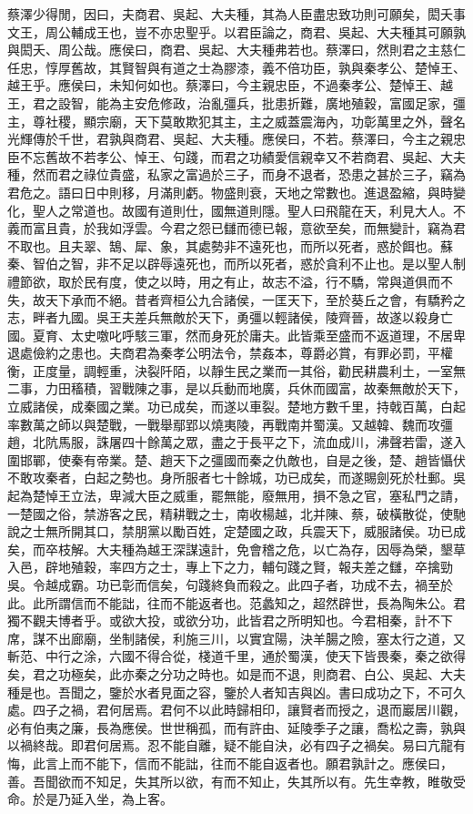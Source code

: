 蔡澤少得閒，因曰，夫商君、吳起、大夫種，其為人臣盡忠致功則可願矣，閎夭事文王，周公輔成王也，豈不亦忠聖乎。以君臣論之，商君、吳起、大夫種其可願孰與閎夭、周公哉。應侯曰，商君、吳起、大夫種弗若也。蔡澤曰，然則君之主慈仁任忠，惇厚舊故，其賢智與有道之士為膠漆，義不倍功臣，孰與秦孝公、楚悼王、越王乎。應侯曰，未知何如也。蔡澤曰，今主親忠臣，不過秦孝公、楚悼王、越王，君之設智，能為主安危修政，治亂彊兵，批患折難，廣地殖穀，富國足家，彊主，尊社稷，顯宗廟，天下莫敢欺犯其主，主之威蓋震海內，功彰萬里之外，聲名光輝傳於千世，君孰與商君、吳起、大夫種。應侯曰，不若。蔡澤曰，今主之親忠臣不忘舊故不若孝公、悼王、句踐，而君之功績愛信親幸又不若商君、吳起、大夫種，然而君之祿位貴盛，私家之富過於三子，而身不退者，恐患之甚於三子，竊為君危之。語曰日中則移，月滿則虧。物盛則衰，天地之常數也。進退盈縮，與時變化，聖人之常道也。故國有道則仕，國無道則隱。聖人曰飛龍在天，利見大人。不義而富且貴，於我如浮雲。今君之怨已讎而德已報，意欲至矣，而無變計，竊為君不取也。且夫翠、鵠、犀、象，其處勢非不遠死也，而所以死者，惑於餌也。蘇秦、智伯之智，非不足以辟辱遠死也，而所以死者，惑於貪利不止也。是以聖人制禮節欲，取於民有度，使之以時，用之有止，故志不溢，行不驕，常與道俱而不失，故天下承而不絕。昔者齊桓公九合諸侯，一匡天下，至於葵丘之會，有驕矜之志，畔者九國。吳王夫差兵無敵於天下，勇彊以輕諸侯，陵齊晉，故遂以殺身亡國。夏育、太史噭叱呼駭三軍，然而身死於庸夫。此皆乘至盛而不返道理，不居卑退處儉約之患也。夫商君為秦孝公明法令，禁姦本，尊爵必賞，有罪必罰，平權衡，正度量，調輕重，決裂阡陌，以靜生民之業而一其俗，勸民耕農利土，一室無二事，力田稸積，習戰陳之事，是以兵動而地廣，兵休而國富，故秦無敵於天下，立威諸侯，成秦國之業。功已成矣，而遂以車裂。楚地方數千里，持戟百萬，白起率數萬之師以與楚戰，一戰舉鄢郢以燒夷陵，再戰南并蜀漢。又越韓、魏而攻彊趙，北阬馬服，誅屠四十餘萬之眾，盡之于長平之下，流血成川，沸聲若雷，遂入圍邯鄲，使秦有帝業。楚、趙天下之彊國而秦之仇敵也，自是之後，楚、趙皆懾伏不敢攻秦者，白起之勢也。身所服者七十餘城，功已成矣，而遂賜劍死於杜郵。吳起為楚悼王立法，卑減大臣之威重，罷無能，廢無用，損不急之官，塞私門之請，一楚國之俗，禁游客之民，精耕戰之士，南收楊越，北并陳、蔡，破橫散從，使馳說之士無所開其口，禁朋黨以勵百姓，定楚國之政，兵震天下，威服諸侯。功已成矣，而卒枝解。大夫種為越王深謀遠計，免會稽之危，以亡為存，因辱為榮，墾草入邑，辟地殖穀，率四方之士，專上下之力，輔句踐之賢，報夫差之讎，卒擒勁吳。令越成霸。功已彰而信矣，句踐終負而殺之。此四子者，功成不去，禍至於此。此所謂信而不能詘，往而不能返者也。范蠡知之，超然辟世，長為陶朱公。君獨不觀夫博者乎。或欲大投，或欲分功，此皆君之所明知也。今君相秦，計不下席，謀不出廊廟，坐制諸侯，利施三川，以實宜陽，決羊腸之險，塞太行之道，又斬范、中行之涂，六國不得合從，棧道千里，通於蜀漢，使天下皆畏秦，秦之欲得矣，君之功極矣，此亦秦之分功之時也。如是而不退，則商君、白公、吳起、大夫種是也。吾聞之，鑒於水者見面之容，鑒於人者知吉與凶。書曰成功之下，不可久處。四子之禍，君何居焉。君何不以此時歸相印，讓賢者而授之，退而巖居川觀，必有伯夷之廉，長為應侯。世世稱孤，而有許由、延陵季子之讓，喬松之壽，孰與以禍終哉。即君何居焉。忍不能自離，疑不能自決，必有四子之禍矣。易曰亢龍有悔，此言上而不能下，信而不能詘，往而不能自返者也。願君孰計之。應侯曰，善。吾聞欲而不知足，失其所以欲，有而不知止，失其所以有。先生幸教，睢敬受命。於是乃延入坐，為上客。

